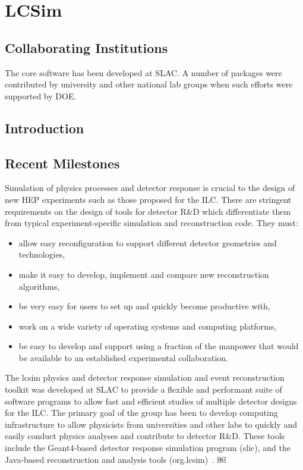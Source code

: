 \section{LCSim}
\subsection{Collaborating Institutions}

The core software has been developed at SLAC. A number of packages were
contributed by university and other national lab groups when such efforts were
supported by DOE.

\subsection{Introduction}
\subsection{Recent Milestones}

Simulation of physics processes and detector response is crucial to the design
of new HEP experiments such as those proposed for the ILC. There are stringent
requirements on the design of tools for detector R\&D which differentiate them
from typical experiment-specific simulation and reconstruction code. They must:
\begin{itemize}
\item allow easy reconfiguration to support different detector geometries and technologies,
\item make it easy to develop, implement and compare new reconstruction algorithms,
\item be very easy for users to set up and quickly become productive with,
\item work on a wide variety of operating systems and computing platforms,
\item be easy to develop and support using a fraction of the manpower that would be available to an established experimental collaboration.
\end{itemize}
The lcsim physics and detector response simulation and event reconstruction
toolkit was developed at SLAC to provide a flexible and performant suite of
software programs to allow fast and efficient studies of multiple detector
designs for the ILC. The primary goal of the group has been to develop computing
infrastructure to allow physicists from universities and other labs to quickly
and easily conduct physics analyses and contribute to detector R\&D. These tools
include the Geant4-based detector response simulation program (slic), and the
Java-based reconstruction and analysis tools (org.lcsim)~\cite{lcsimWebpage}.
￼
